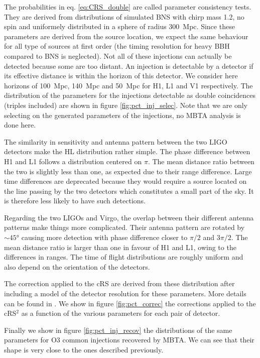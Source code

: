 The probabilities in eq. \ref{eq:CRS_double} are called parameter consistency tests.
They are derived from distributions of simulated BNS with chirp mass \SI{1.2}{\msun}, no spin and uniformely distributed in a sphere of radius \SI{300}{Mpc}.
Since these parameters are derived from the source location, we expect the same behaviour for all type of sources at first order (the timing resolution for heavy BBH compared to BNS is neglected).
Not all of these injections can actually be detected because some are too distant.
An injection is detectable by a detector if its effective distance is within the horizon of this detector.
We consider here horizons of \SI{100}{Mpc}, \SI{140}{Mpc} and \SI{50}{Mpc} for H1, L1 and V1 respectively.
The distribution of the parameters for the injections detectable as double coincidences (triples included) are shown in figure \ref{fig:pct_inj_selec}.
Note that we are only selecting on the generated parameters of the injections, no MBTA analysis is done here.

The similarity in sensitivity and antenna pattern between the two LIGO detectors make the HL distribution rather simple.
The phase difference between H1 and L1 follows a distribution centered on $\pi$.
The mean distance ratio between the two is slightly less than one, as expected due to their range difference.
Large time differences are deprecated because they would require a source located on the line passing by the two detectors which constitutes a small part of the sky.
It is therefore less likely to have such detections.

Regarding the two LIGOs and Virgo, the overlap between their different antenna patterns make things more complicated.
Their antenna pattern are rotated by $\sim 45°$ causing more detection with phase difference closer to $\pi/2$ and $3\pi/2$.
The mean distance ratio is larger than one in favour of H1 and L1, owing to the differences in ranges.
The time of flight distributions are roughly uniform and also depend on the orientation of the detectors.

The correction applied to the cRS are derived from these distribution after including a model of the detector resolution for these parameters.
More details can be found in \cite{aubin2020}.
We show in figure \ref{fig:pct_correc} the corrections applied to the cRS$^2$ as a function of the various parameters for each pair of detector.

Finally we show in figure \ref{fig:pct_inj_recov} the distributions of the same parameters for O3 common injections recovered by MBTA.
We can see that their shape is very close to the ones described previously.


